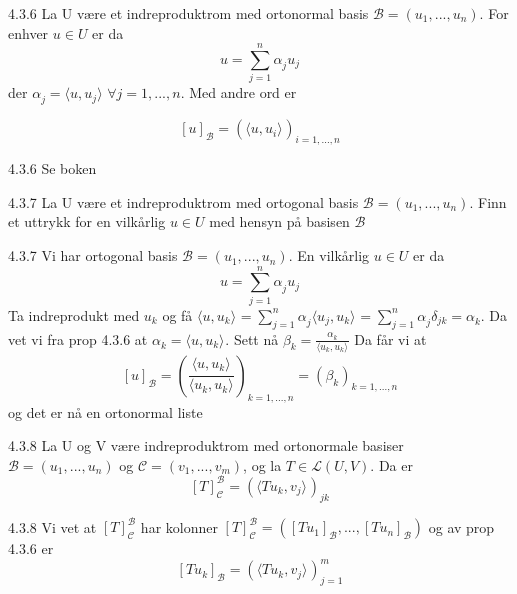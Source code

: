 \documentclass[a4paper,norsk]{article}
\begin{document}
\begin{propositionbox}{4.3.6}{}
La U være et indreproduktrom med ortonormal basis $ \mathcal{B} = \left( u_1, ..., u_n \right)  $. For enhver $ u \in U $ er da 
\[
    u = \sum_{ j=1 }^{ n } \alpha_{j}^{} u_j 
\]
der $ \alpha_{j}^{} = \langle u, u_j \rangle_{  } \; \forall j =1, ..., n $. Med andre ord er 

\[
    \left[ u \right] _{\mathcal{B}} = \left( \langle u, u_i \rangle_{  }  \right) _{i=1, ..., n}
\]
\begin{proofbox}{4.3.6}{}
Se boken
\end{proofbox}
\end{propositionbox}

\begin{oppgavebox}{4.3.7}{}
La U være et indreproduktrom med ortogonal basis $ \mathcal{B} = \left( u_1, ..., u_n \right)  $. Finn et uttrykk for en vilkårlig $ u \in U $ med hensyn på basisen $ \mathcal{B} $ 

\begin{proofbox}{4.3.7}{}
Vi har ortogonal basis $ \mathcal{B} = \left( u_1, ..., u_n \right)  $. En vilkårlig $ u \in U $ er da 
\[
    u = \sum_{ j=1 }^{ n } \alpha_{j}^{} u_j
\]
Ta indreprodukt med $ u_k $ og få $ \langle u, u_k \rangle_{  } = \sum_{ j=1 }^{ n } \alpha_{j}^{} \langle u_j, u_k \rangle_{  } = \sum_{ j=1 }^{ n } \alpha_{j}^{} \delta_{jk} = \alpha_{k}^{}  $. Da vet vi fra prop 4.3.6 at $ \alpha_{k}^{} = \langle u, u_k \rangle_{  } $. Sett nå $ \beta_k = \frac{ \alpha_{k}^{} }{ \langle u_k, u_k \rangle_{  }  }  $  Da får vi at 
\[
    \left[ u \right] _{\mathcal{B}} = \left(  \frac{ \langle u, u_k \rangle_{  }  }{ \langle u_k, u_k \rangle_{  }  } \right) _{k=1, ..., n} = \left( \beta_k \right) _{k=1,...,n}
\]
og det er nå en ortonormal liste
\end{proofbox}
\end{oppgavebox}

\begin{theorembox}{4.3.8}{}
La U og V være indreproduktrom med ortonormale basiser $ \mathcal{B} = \left( u_1, ..., u_n \right)  $ og $ \mathcal{C} = \left( v_1, ..., v_m \right)  $, og la $ T \in \mathcal{L} \left( U, V \right)  $. Da er 
\[
    \left[ T \right] _{\mathcal{C}}^{\mathcal{B}} = \left( \langle Tu_k, v_j \rangle_{  }  \right)_{jk}
\]

\begin{proofbox}{4.3.8}{}
Vi vet at $ \left[ T \right] _{\mathcal{C}}^{\mathcal{B}} $ har kolonner  $ \left[ T \right] _{\mathcal{C}}^{\mathcal{B}} = \left( \left[ Tu_1 \right] _{\mathcal{B}}, ..., \left[ Tu_n \right] _{\mathcal{B}} \right)  $ og av prop 4.3.6 er 
\[
    \left[ Tu_k \right] _{\mathcal{B}} = \left( \langle Tu_k, v_j \rangle_{  }  \right)_{j=1}^m 
\]
\end{proofbox}
\end{theorembox}
\end{document}
